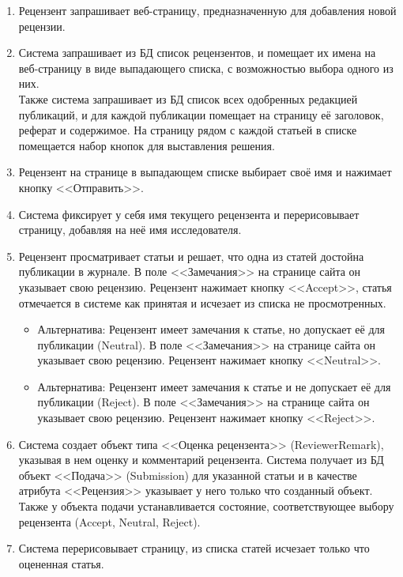 \begin{enumerate}
\item Рецензент запрашивает веб-страницу, предназначенную для добавления новой рецензии.
\item Система запрашивает из БД список рецензентов, и помещает их имена на веб-страницу в виде выпадающего списка, с возможностью выбора одного из них.\\ Также система запрашивает из БД список всех одобренных редакцией публикаций, и для каждой публикации помещает на страницу её заголовок, реферат и содержимое. На страницу рядом с каждой статьей в списке помещается набор кнопок для выставления решения.
\item Рецензент на странице в выпадающем списке выбирает своё имя и нажимает кнопку <<Отправить>>.
\item Система фиксирует у себя имя текущего рецензента и перерисовывает страницу, добавляя на неё имя исследователя.
\item
  Рецензент просматривает статьи и решает, что одна из статей достойна публикации в журнале. В поле <<Замечания>> на странице сайта он указывает свою рецензию. Рецензент нажимает кнопку <<Accept>>, статья отмечается в системе как принятая и исчезает из списка не просмотренных.
  
  \begin{itemize}
  \item
    Альтернатива: Рецензент имеет замечания к статье, но допускает её для публикации (Neutral). В поле <<Замечания>> на странице сайта он указывает свою рецензию. Рецензент нажимает кнопку <<Neutral>>.
  \item
    Альтернатива: Рецензент имеет замечания к статье и не допускает её для публикации (Reject). В поле <<Замечания>> на странице сайта он указывает свою рецензию. Рецензент нажимает кнопку <<Reject>>.
  \end{itemize}
\item Система создает объект типа <<Оценка рецензента>> (ReviewerRemark), указывая в нем оценку и комментарий рецензента. Система получает из БД объект <<Подача>> (Submission) для указанной статьи и в качестве атрибута <<Рецензия>> указывает у него только что созданный объект. Также у объекта подачи устанавливается состояние, соответствующее выбору рецензента (Accept, Neutral, Reject).
\item Система перерисовывает страницу, из списка статей исчезает только что оцененная статья.
\end{enumerate}

